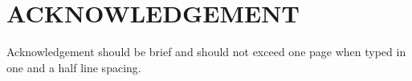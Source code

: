 \chapter*{\uppercase{ACKNOWLEDGEMENT}}
Acknowledgement should be brief and should not exceed one page when typed in one and a half line spacing.